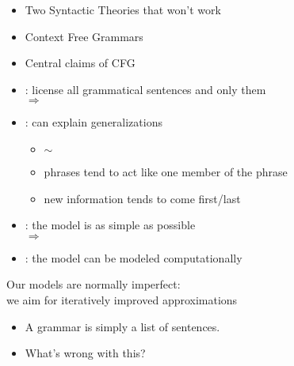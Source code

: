 \documentclass[a4paper,landscape,headrule,footrule]{foils}
\begin{document}
\maketitle

%


\begin{itemize}
\item Two Syntactic Theories that won’t work
\item Context Free Grammars
\item Central claims of CFG
\end{itemize}



\begin{itemize}
\item {}: license all grammatical sentences and only them
\\ $\Rightarrow$ 
\item {}: can explain generalizations
  \begin{itemize}
  \item  {} $\sim$  
  \item phrases tend to act like one member of the phrase 
  \item new information tends to come first/last 
  \end{itemize}
\item {}: the model is as simple as possible 
\\ $\Rightarrow$  
\item {}: the model can be modeled computationally
\end{itemize}

\begin{center}
  Our models are normally imperfect: \\
we aim for iteratively improved approximations
\end{center}

\begin{itemize}
\item A grammar is simply a list of sentences.
\item What’s wrong with this?
\end{itemize}
\end{document}
